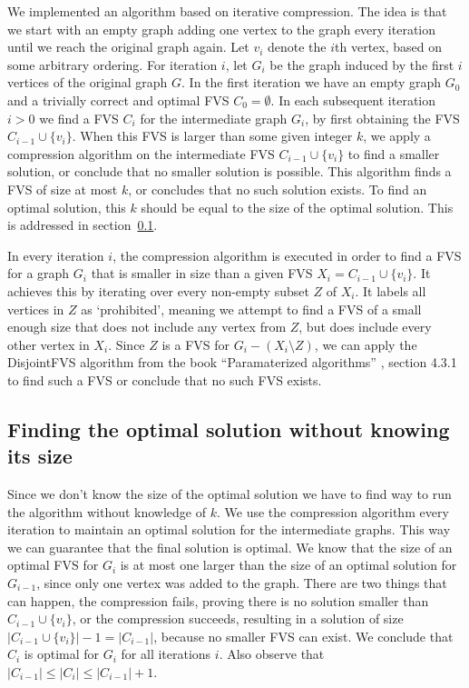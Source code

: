 We implemented an algorithm based on iterative compression. The idea is that we start with an empty graph adding one
vertex to the graph every iteration until we reach the original graph again. Let $v_i$ denote the $i$th vertex, based on
some arbitrary ordering. For iteration $i$, let $G_i$ be the graph induced by the first $i$ vertices of the original graph
$G$. In the first iteration we have an empty graph $G_0$ and a trivially correct and optimal FVS $C_0 = \emptyset$. In
each subsequent iteration $i>0$ we find a FVS $C_i$ for the intermediate graph $G_i$, by first obtaining the FVS $C_{i-1}
\cup \{v_i\}$. When this FVS is larger than some given integer $k$, we apply a compression algorithm on the intermediate
FVS $C_{i-1} \cup \{v_i\}$ to find a smaller solution, or conclude that no smaller solution is possible. This algorithm
finds a FVS of size at most $k$, or concludes that no such solution exists. To find an optimal solution, this $k$ should
be equal to the size of the optimal solution. This is addressed in section~\ref{sec:noK}.

In every iteration $i$, the compression algorithm is executed in order to find a FVS for a graph $G_i$ that is smaller in
size than a given FVS $X_i = C_{i-1} \cup \{v_i\}$. It achieves this by iterating over every non-empty subset $Z$ of
$X_i$. It labels all vertices in $Z$ as `prohibited', meaning we attempt to find a FVS of a small enough size that does
not include any vertex from $Z$, but does include every other vertex in $X_i$. Since $Z$ is a FVS for $G_i-(X_i\setminus
Z)$, we can apply the {\sc DisjointFVS} algorithm from the book ``Paramaterized algorithms'' \cite{ftpbook}, section 4.3.1
to find such a FVS or conclude that no such FVS exists.

\subsection{Finding the optimal solution without knowing its size} \label{sec:noK}
Since we don't know the size of the optimal solution we have to find way to run the algorithm without knowledge of $k$. We
use the compression algorithm every iteration to maintain an optimal solution for the intermediate graphs. This way we can
guarantee that the final solution is optimal. We know that the size of an optimal FVS for $G_i$ is at most one larger than
the size of an optimal solution for $G_{i-1}$, since only one vertex was added to the graph. There are two things that can
happen, the compression fails, proving there is no solution smaller than $C_{i-1} \cup \{v_i\}$, or the compression
succeeds, resulting in a solution of size $|C_{i-1} \cup \{v_i\}|-1 = |C_{i-1}|$, because no smaller FVS can exist. We
conclude that $C_i$ is optimal for $G_i$ for all iterations $i$. Also observe that $|C_{i-1}| \leq |C_i| \leq |C_{i-1}|
+1$.

